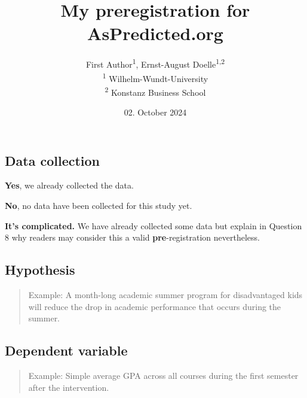 \documentclass[]{article}
\title{My preregistration for AsPredicted.org}
\author{
          First Author\textsuperscript{1},
          Ernst-August
Doelle\textsuperscript{1,2}          \\ \vspace{0.5cm}
              \textsuperscript{1} Wilhelm-Wundt-University\\
              \textsuperscript{2} Konstanz Business School      }
\date{02. October 2024}
\newcounter{question}
\begin{document}
\maketitle
\vspace{2pc}


\ifPDFTeX
  \newcommand\Question[2]{%
   \leavevmode\par
   \stepcounter{question}
   \noindent
   \textbf{\thequestion. #1}. #2\par}
\else %
  \NewCommandCopy{\oldQuestion}{\Question}
  \renewcommand\Question[2]{%
   \leavevmode\par
   \stepcounter{question}
   \noindent
   \textbf{\thequestion. #1}. #2\par}
\fi



\newcommand\Answer[1]{%
    \noindent
    \textit{Registered response}: #1\par}

\hypertarget{data-collection}{%
\subsection{Data collection}\label{data-collection}}

\textbf{Yes}, we already collected the data.

\textbf{No}, no data have been collected for this study yet.

\textbf{It's complicated.} We have already collected some data but
explain in Question 8 why readers may consider this a valid
\textbf{pre}-registration nevertheless.

\hypertarget{hypothesis}{%
\subsection{Hypothesis}\label{hypothesis}}

\begin{quote}
Example: A month-long academic summer program for disadvantaged kids
will reduce the drop in academic performance that occurs during the
summer.
\end{quote}

\hypertarget{dependent-variable}{%
\subsection{Dependent variable}\label{dependent-variable}}

\begin{quote}
Example: Simple average GPA across all courses during the first semester
after the intervention.
\end{quote}
\end{document}
